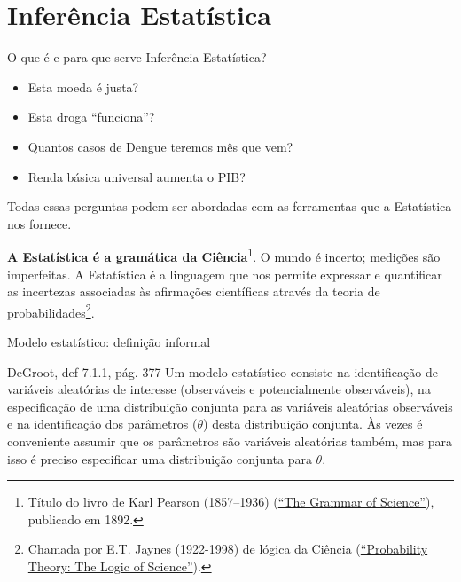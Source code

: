 \section*{Inferência Estatística}
\begin{frame}{O que é e para que serve Inferência Estatística?}

\begin{itemize}
 \item[\faQuestion] Esta moeda é justa?
 \item[\faQuestion] Esta droga ``funciona''?
 \item[\faQuestion] Quantos casos de Dengue teremos mês que vem?
 \item[\faQuestion] Renda básica universal aumenta o PIB?
\end{itemize}

Todas essas perguntas podem ser abordadas com as ferramentas que a Estatística nos fornece.

\begin{ideia}
\label{idea:statistics_grammar_science}
\textbf{A Estatística é a gramática da Ciência}\footnote{Título do livro de Karl Pearson (1857--1936) (\href{https://en.wikipedia.org/wiki/The_Grammar_of_Science}{``The Grammar of Science''}), publicado em 1892.}.
O mundo é incerto; medições são imperfeitas.
A Estatística é a linguagem que nos permite expressar e quantificar as incertezas associadas às afirmações científicas através da teoria de probabilidades\footnote{Chamada por E.T. Jaynes (1922-1998) de lógica da Ciência (\href{https://www.cambridge.org/gb/academic/subjects/physics/theoretical-physics-and-mathematical-physics/probability-theory-logic-science}{``Probability Theory: The Logic of Science''}).}.
\end{ideia}
\end{frame}
\begin{frame}{Modelo estatístico: definição informal}
\begin{defn}
\label{def:statistical_model_informal}
DeGroot, def 7.1.1, pág. 377
Um modelo estatístico consiste na identificação de variáveis aleatórias de interesse (observáveis e potencialmente observáveis), na especificação de uma distribuição conjunta para as variáveis aleatórias observáveis e na identificação dos parâmetros ($\theta$) desta distribuição conjunta.
Às vezes é conveniente assumir que os parâmetros são variáveis aleatórias também, mas para isso é preciso especificar uma distribuição conjunta para $\theta$.
\end{defn}
 
\end{frame}
